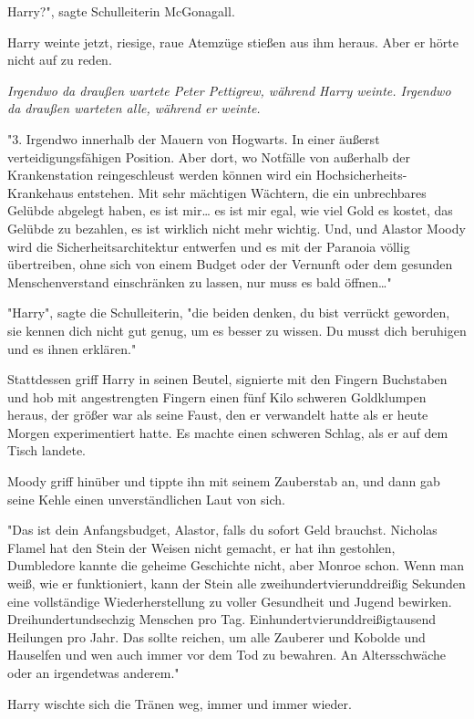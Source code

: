 {Harry?", sagte Schulleiterin McGonagall.

Harry weinte jetzt, riesige, raue Atemzüge stießen aus ihm heraus. Aber er hörte nicht auf zu reden.

\emph{Irgendwo da draußen wartete Peter Pettigrew, während Harry weinte. Irgendwo da draußen warteten alle, während er weinte.}

"3. Irgendwo innerhalb der Mauern von Hogwarts. In einer äußerst verteidigungsfähigen Position. Aber dort, wo Notfälle von außerhalb der Krankenstation reingeschleust werden können wird ein Hochsicherheits-Krankehaus entstehen. Mit sehr mächtigen Wächtern, die ein unbrechbares Gelübde abgelegt haben, es ist mir… es ist mir egal, wie viel Gold es kostet, das Gelübde zu bezahlen, es ist wirklich nicht mehr wichtig. Und, und Alastor Moody wird die Sicherheitsarchitektur entwerfen und es mit der Paranoia völlig übertreiben, ohne sich von einem Budget oder der Vernunft oder dem gesunden Menschenverstand einschränken zu lassen, nur muss es bald öffnen…"

"Harry", sagte die Schulleiterin, "die beiden denken, du bist verrückt geworden, sie kennen dich nicht gut genug, um es besser zu wissen. Du musst dich beruhigen und es ihnen erklären."

Stattdessen griff Harry in seinen Beutel, signierte mit den Fingern Buchstaben und hob mit angestrengten Fingern einen fünf Kilo schweren Goldklumpen heraus, der größer war als seine Faust, den er verwandelt hatte als er heute Morgen experimentiert hatte. Es machte einen schweren Schlag, als er auf dem Tisch landete.

Moody griff hinüber und tippte ihn mit seinem Zauberstab an, und dann gab seine Kehle einen unverständlichen Laut von sich.

"Das ist dein Anfangsbudget, Alastor, falls du sofort Geld brauchst. Nicholas Flamel hat den Stein der Weisen nicht gemacht, er hat ihn gestohlen, Dumbledore kannte die geheime Geschichte nicht, aber Monroe schon. Wenn man weiß, wie er funktioniert, kann der Stein alle zweihundertvierunddreißig Sekunden eine vollständige Wiederherstellung zu voller Gesundheit und Jugend bewirken. Dreihundertundsechzig Menschen pro Tag. Einhundertvierunddreißigtausend Heilungen pro Jahr. Das sollte reichen, um alle Zauberer und Kobolde und Hauselfen und wen auch immer vor dem Tod zu bewahren. An Altersschwäche oder an irgendetwas anderem."

Harry wischte sich die Tränen weg, immer und immer wieder.

}
